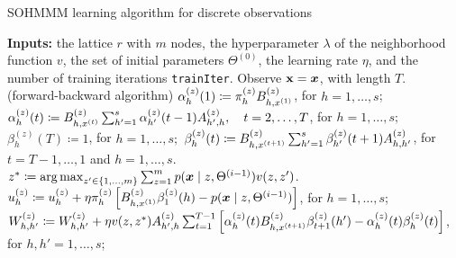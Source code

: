 \begin{algorithm}
    \caption{SOHMMM learning algorithm for discrete observations \cite{Ferles2008}}
    \label{alg:sohmmm_discrete}

    \begin{algorithmic}[1]
        \State \textbf{Inputs:} the lattice $r$ with $m$ nodes, the hyperparameter $\lambda$ of the neighborhood function $v$, the set of initial parameters $\Theta^{(0)}$, the learning rate $\eta$, and the number of training iterations \texttt{trainIter}.
        \vspace{0.3cm}
        \vspace{0.3cm}
        \State Observe ${\mathbf{x}} = {\bm{x}}$, with length $T$.
        \vspace{0.3cm}
         $\quad$(forward-backward algorithm)
        \vspace{0.3cm}
        \State $ \alpha_h^{(z)}(1) \coloneqq \pi_{h}^{(z)}{B}^{(z)}_{h,x^{(1)}}$, for $h = 1, \dots, s$;
        \vspace{0.3cm}
        \State $ \alpha_{h}^{(z)}(t) \coloneqq {B}^{(z)}_{h,x^{(t)}} \sum_{h'=1}^{s}\alpha_{h'}^{(z)}(t-1){A}^{(z)}_{h',h}, \quad t = 2, \dots, T$, for $h = 1, \dots, s;$
        \vspace{0.3cm}
        \State $ \beta_{h}^{(z)}(T) \coloneqq 1$, for $h = 1, \dots, s;$
        \vspace{0.3cm}
        \State $ \beta_{h}^{(z)}(t) \coloneqq {B}^{(z)}_{h,x^{(t+1)}} \sum_{h'=1}^{s} \beta_{h'}^{(z)}(t+1) {A}^{(z)}_{h,h'}$, for $t = T-1, \dots,  1$ and $h = 1, \dots, s$.
        \vspace{0.3cm}
        \EndFor
        \vspace{0.3cm}
        \State $z^* \coloneqq  \operatorname*{arg\,max}_{z' \in \{1,\dots,m\}} \sum_{z=1}^m p({\bm{x}} \mid z, \Theta^{(i-1)})v(z, z')$.
        \vspace{0.3cm}
        \vspace{0.3cm}
        \State $ {u}_h^{(z)} \coloneqq {u}_h^{(z)} + \eta  {\pi}_h^{(z)} \left[ {B}^{(z)}_{h,x^{(1)}} \beta_{1}^{(z)}(h) - p({\bm{x}} \mid z, \Theta^{(i-1)}) \right]$, for $h = 1, \dots, s$;
        \vspace{0.3cm}
        \State $ {W}^{(z)}_{h,h'} \coloneqq  {W}^{(z)}_{h,h'} + \eta v(z,z^*) {A}^{(z)}_{h',h}\sum_{t=1}^{T-1}\left[\alpha_{h}^{(z)}(t) {B}^{(z)}_{h,x^{(t+1)}}\beta_{t+1}^{(z)}(h') - \alpha_{h}^{(z)}(t)\beta_{h}^{(z)}(t) \right]$, for $h,h' = 1, \dots, s$;

\end{algorithmic}
\end{algorithm}
